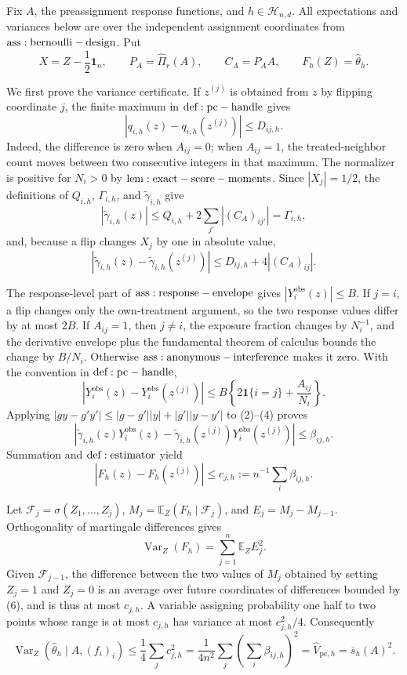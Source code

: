 Fix \(A\), the preassignment response functions, and \(h\in\mathcal H_{n,d}\).  All expectations and variances below are over the independent assignment coordinates from \({\rm ass:bernoulli-design}\).  Put
\[
 X=Z-\frac12\mathbf1_n,\qquad P_A=\widehat\Pi_r(A),\qquad C_A=P_AA,
 \qquad F_h(Z)=\widehat\theta_h.
\]

We first prove the variance certificate.  If \(z^{(j)}\) is obtained from \(z\) by flipping coordinate \(j\), the finite maximum in \({\rm def:pc-handle}\) gives
\[
 |q_{i,h}(z)-q_{i,h}(z^{(j)})|\leq D_{ij,h}.
\tag{1}
\]
Indeed, the difference is zero when \(A_{ij}=0\); when \(A_{ij}=1\), the treated-neighbor count moves between two consecutive integers in that maximum.  The normalizer is positive for \(N_i>0\) by \({\rm lem:exact-score-moments}\).  Since \(|X_j|=1/2\), the definitions of \(Q_{i,h}\), \(\Gamma_{i,h}\), and \(\widetilde\gamma_{i,h}\) give
\[
 |\widetilde\gamma_{i,h}(z)|\leq Q_{i,h}+2\sum_{j'}|(C_A)_{ij'}|=\Gamma_{i,h},
\tag{2}
\]
and, because a flip changes \(X_j\) by one in absolute value,
\[
 |\widetilde\gamma_{i,h}(z)-\widetilde\gamma_{i,h}(z^{(j)})|
 \leq D_{ij,h}+4|(C_A)_{ij}|.
\tag{3}
\]

The response-level part of \({\rm ass:response-envelope}\) gives \(|Y_i^{\mathrm{obs}}(z)|\leq B\).  If \(j=i\), a flip changes only the own-treatment argument, so the two response values differ by at most \(2B\).  If \(A_{ij}=1\), then \(j\ne i\), the exposure fraction changes by \(N_i^{-1}\), and the derivative envelope plus the fundamental theorem of calculus bounds the change by \(B/N_i\).  Otherwise \({\rm ass:anonymous-interference}\) makes it zero.  With the convention in \({\rm def:pc-handle}\),
\[
 |Y_i^{\mathrm{obs}}(z)-Y_i^{\mathrm{obs}}(z^{(j)})|
 \leq B\left\{2\mathbf1\{i=j\}+\frac{A_{ij}}{N_i}\right\}.
\tag{4}
\]
Applying \(|gy-g'y'|\leq|g-g'||y|+|g'||y-y'|\) to (2)--(4) proves
\[
 |\widetilde\gamma_{i,h}(z)Y_i^{\mathrm{obs}}(z)
 -\widetilde\gamma_{i,h}(z^{(j)})Y_i^{\mathrm{obs}}(z^{(j)})|
 \leq\beta_{ij,h}.
\tag{5}
\]
Summation and \({\rm def:estimator}\) yield
\[
 |F_h(z)-F_h(z^{(j)})|
 \leq c_{j,h}:=n^{-1}\sum_i\beta_{ij,h}.
\tag{6}
\]

Let \(\mathcal F_j=\sigma(Z_1,\ldots,Z_j)\), \(M_j=\mathbb E_Z(F_h\mid\mathcal F_j)\), and \(E_j=M_j-M_{j-1}\).  Orthogonality of martingale differences gives
\[
 \operatorname{Var}_Z(F_h)=\sum_{j=1}^n\mathbb E_ZE_j^2.
\tag{7}
\]
Given \(\mathcal F_{j-1}\), the difference between the two values of \(M_j\) obtained by setting \(Z_j=1\) and \(Z_j=0\) is an average over future coordinates of differences bounded by (6), and is thus at most \(c_{j,h}\).  A variable assigning probability one half to two points whose range is at most \(c_{j,h}\) has variance at most \(c_{j,h}^2/4\).  Consequently
\[
 \operatorname{Var}_Z(\widehat\theta_h\mid A,(f_i)_i)
 \leq\frac14\sum_jc_{j,h}^2
 =\frac1{4n^2}\sum_j\left(\sum_i\beta_{ij,h}\right)^2
 =\widehat V_{\mathrm{pc},h}=\overline s_h(A)^2.
\tag{8}
\]

